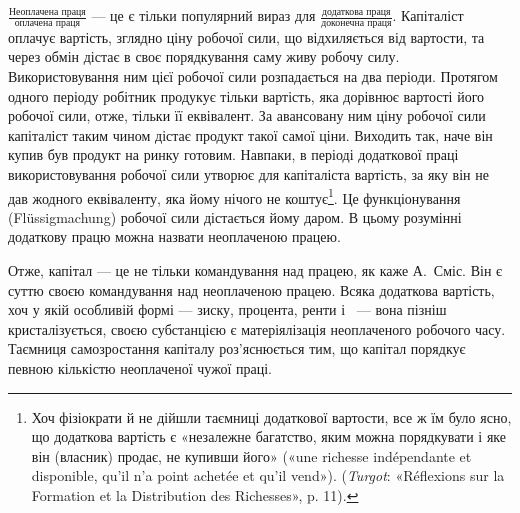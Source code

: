 \parcont{}  %
$\frac{\text{Неоплачена праця}}{\text{оплачена праця}}$ — це є тільки популярний вираз для
$\frac{\text{додаткова праця}}{\text{доконечна праця}}$. Капіталіст оплачує вартість, зглядно ціну
робочої сили, що відхиляється від вартости, та через обмін дістає в своє порядкування саму живу
робочу силу. Використовування ним цієї робочої сили розпадається на два періоди. Протягом одного
періоду робітник продукує тільки вартість,
яка дорівнює вартості його робочої сили, отже, тільки її еквівалент.
За авансовану ним ціну робочої сили капіталіст таким
чином дістає продукт такої самої ціни. Виходить так, наче він
купив був продукт на ринку готовим. Навпаки, в періоді додаткової
праці використовування робочої сили утворює для капіталіста
вартість, за яку він не дав жодного еквіваленту, яка
йому нічого не коштує\footnote{
Хоч фізіократи й не дійшли таємниці додаткової вартости, все ж
їм було ясно, що додаткова вартість є «незалежне багатство, яким можна
порядкувати і яке він (власник) продає, не купивши його» («une richesse
indépendante et disponible, qu’il n’a point achetée et qu'il vend»). (\emph{Turgot}:
«Réflexions sur la Formation et la Distribution des Richesses», p. 11).
}. Це функціонування (Flüssigmachung)
робочої сили дістається йому даром. В цьому розумінні додаткову
працю можна назвати неоплаченою працею.

Отже, капітал — це не тільки командування над працею,
як каже А.~Сміс. Він є суттю своєю командування над неоплаченою
працею. Всяка додаткова вартість, хоч у якій особливій
формі — зиску, процента, ренти і~ — вона пізніш кристалізується,
своєю субстанцією є матеріялізація неоплаченого робочого
часу. Таємниця самозростання капіталу роз’яснюється тим,
що капітал порядкує певною кількістю неоплаченої чужої праці.
